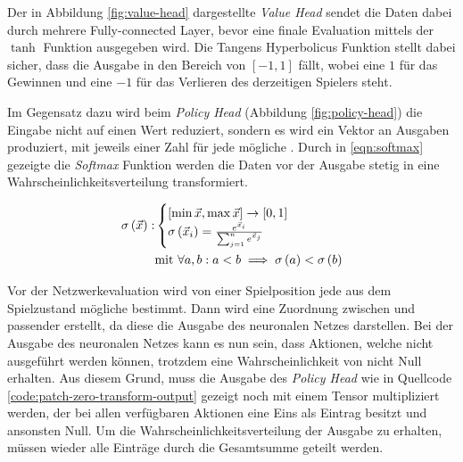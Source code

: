 Der in Abbildung \ref{fig:value-head} dargestellte \emph{Value Head} sendet die Daten dabei durch mehrere Fully-connected Layer, bevor eine finale Evaluation mittels der $\tanh$ Funktion ausgegeben wird. Die Tangens Hyperbolicus Funktion stellt dabei sicher, dass die Ausgabe in den Bereich von $\left[-1,1\right]$ fällt, wobei eine $1$ für das Gewinnen und eine $-1$ für das Verlieren des derzeitigen Spielers steht.

\pagebreak

Im Gegensatz dazu wird beim \emph{Policy Head} (Abbildung \ref{fig:policy-head}) die Eingabe nicht auf einen Wert reduziert, sondern es wird ein Vektor an Ausgaben produziert, mit jeweils einer Zahl für jede mögliche \hyperref[text:natural-action-id]{}. Durch in \ref{eqn:softmax} gezeigte die \emph{Softmax} Funktion werden die Daten vor der Ausgabe stetig in eine Wahrscheinlichkeitsverteilung transformiert.

\vspace*{-0.85cm}
\begin{align}
    \label{eqn:softmax}
    \sigma\left(\vec{x}\right): & \begin{cases}
        [\min \vec{x}, \max \vec{x}] \to \left[0,1\right] \\
        \sigma\left(\vec{x}_i\right)= \frac{e^{\vec{x}_i}}{\sum_{j=1}^n e^{\vec{x}_j}}
        \end{cases} \\
        &   \text{mit } \forall a,b: a<b \implies \sigma\left(a\right) < \sigma\left(b\right) \notag
\end{align}
\vspace*{-1.2cm}

Vor der Netzwerkevaluation wird von einer Spielposition jede aus dem Spielzustand mögliche \hyperref[text:action-id]{} bestimmt. Dann wird eine Zuordnung zwischen \hyperref[text:action-id]{} und passender \hyperref[text:natural-action-id]{} erstellt, da diese die Ausgabe des neuronalen Netzes darstellen. Bei der Ausgabe des neuronalen Netzes kann es nun sein, dass Aktionen, welche nicht ausgeführt werden können, trotzdem eine Wahrscheinlichkeit von nicht Null erhalten. Aus diesem Grund, muss die Ausgabe des \emph{Policy Head} wie in Quellcode \ref{code:patch-zero-transform-output} gezeigt noch mit einem Tensor multipliziert werden, der bei allen verfügbaren Aktionen eine Eins als Eintrag besitzt und ansonsten Null. Um die Wahrscheinlichkeitsverteilung der Ausgabe zu erhalten, müssen wieder alle Einträge durch die Gesamtsumme geteilt werden.

